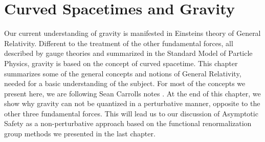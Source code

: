\chapter{Curved Spacetimes and Gravity}\label{chap:GR}
Our current understanding of gravity is manifested in Einsteins theory of General Relativity. Different to the treatment of the other fundamental forces, all described by gauge theories and summarized in the Standard Model of Particle Physics, gravity is based on the concept of curved spacetime. This chapter summarizes some of the general concepts and notions of General Relativity, needed for a basic understanding of the subject. For most of the concepts we present here, we are following Sean Carrolls notes \cite{CarrollGR}. At the end of this chapter, we show why gravity can not be quantized in a perturbative manner, opposite to the other three fundamental forces. This will lead us to our discussion of Asymptotic Safety as a non-perturbative approach based on the functional renormalization group methods we presented in the last chapter.  

